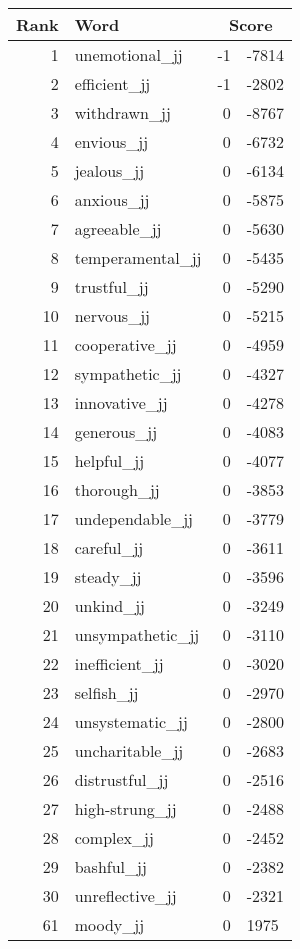 \begin{longtable}[!htbp]{| rlr@{.}l |}
    \hline
    \textbf{Rank} & \textbf{Word} & \multicolumn{2}{c|}{\textbf{Score}} \\
    \hline
    \endhead
    1 & unemotional\_jj & -1 & -7814 \\
    2 & efficient\_jj & -1 & -2802 \\
    3 & withdrawn\_jj & 0 & -8767 \\
    4 & envious\_jj & 0 & -6732 \\
    5 & jealous\_jj & 0 & -6134 \\
    6 & anxious\_jj & 0 & -5875 \\
    7 & agreeable\_jj & 0 & -5630 \\
    8 & temperamental\_jj & 0 & -5435 \\
    9 & trustful\_jj & 0 & -5290 \\
    10 & nervous\_jj & 0 & -5215 \\
    11 & cooperative\_jj & 0 & -4959 \\
    12 & sympathetic\_jj & 0 & -4327 \\
    13 & innovative\_jj & 0 & -4278 \\
    14 & generous\_jj & 0 & -4083 \\
    15 & helpful\_jj & 0 & -4077 \\
    16 & thorough\_jj & 0 & -3853 \\
    17 & undependable\_jj & 0 & -3779 \\
    18 & careful\_jj & 0 & -3611 \\
    19 & steady\_jj & 0 & -3596 \\
    20 & unkind\_jj & 0 & -3249 \\
    21 & unsympathetic\_jj & 0 & -3110 \\
    22 & inefficient\_jj & 0 & -3020 \\
    23 & selfish\_jj & 0 & -2970 \\
    24 & unsystematic\_jj & 0 & -2800 \\
    25 & uncharitable\_jj & 0 & -2683 \\
    26 & distrustful\_jj & 0 & -2516 \\
    27 & high-strung\_jj & 0 & -2488 \\
    28 & complex\_jj & 0 & -2452 \\
    29 & bashful\_jj & 0 & -2382 \\
    30 & unreflective\_jj & 0 & -2321 \\
    61 & moody\_jj & 0 & 1975 \\

\end{longtable}
